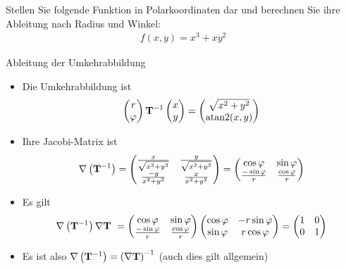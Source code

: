 \begin{Aufgabe}
  Stellen Sie folgende Funktion in Polarkoordinaten dar und berechnen
  Sie ihre Ableitung nach Radius und Winkel:
  \begin{gather*}
    f(x,y) = x^3 + x y^2
  \end{gather*}
\end{Aufgabe}



\begin{frame}{Ableitung der Umkehrabbildung}
  \begin{itemize}
  \item Die Umkehrabbildung ist
    \begin{gather*}
      \begin{pmatrix}
        r\\\varphi
      \end{pmatrix}
      \mathbf{T}^{-1}
      \begin{pmatrix}
        x\\y
      \end{pmatrix}
      =
      \begin{pmatrix}
        \sqrt{x^2+y^2}\\\operatorname{atan2}(x,y)
      \end{pmatrix}
    \end{gather*}
  \item Ihre Jacobi-Matrix ist
    \begin{gather*}
      \nabla \left(\mathbf{T}^{-1}\right) =
      \begin{pmatrix}
        \frac x{\sqrt{x^2+y^2}} & \frac y{\sqrt{x^2+y^2}}\\
        \frac {-y}{x^2+y^2} & \frac x{x^2+y^2}
      \end{pmatrix}
      =
      \begin{pmatrix}
        \cos\varphi & \sin \varphi\\
        \tfrac{-\sin\varphi}r & \tfrac{\cos\varphi}r
      \end{pmatrix}
    \end{gather*}
  \item Es gilt
    \begin{gather*}
      \nabla \left(\mathbf{T}^{-1}\right) \nabla \mathbf{T}\
      = \begin{pmatrix}
          \cos\varphi & \sin \varphi\\
          \tfrac{-\sin\varphi}r & \tfrac{\cos\varphi}r
        \end{pmatrix}
              \begin{pmatrix}
        \cos \varphi & -r \sin \varphi \\
        \sin \varphi & r \cos \varphi
      \end{pmatrix} =
      \begin{pmatrix}
        1 & 0 \\ 0 & 1
      \end{pmatrix}
    \end{gather*}
  \item Es ist also $\nabla \left(\mathbf{T}^{-1}\right) =  \left(\nabla \mathbf{T}\right)^{-1}$ (auch dies gilt allgemein)
  \end{itemize}
\end{frame}

